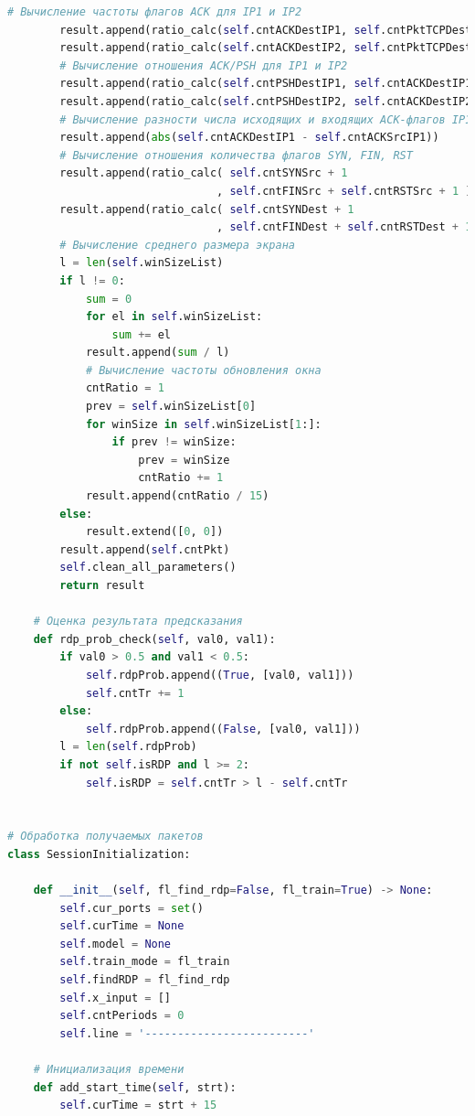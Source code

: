 \documentclass[bachelor, och, coursework]{SCWorks}
\begin{document}
\begin{lstlisting}[language=Python]
        # Вычисление частоты флагов ACK для IP1 и IP2
        result.append(ratio_calc(self.cntACKDestIP1, self.cntPktTCPDestIP1))
        result.append(ratio_calc(self.cntACKDestIP2, self.cntPktTCPDestIP2))
        # Вычисление отношения ACK/PSH для IP1 и IP2
        result.append(ratio_calc(self.cntPSHDestIP1, self.cntACKDestIP1))
        result.append(ratio_calc(self.cntPSHDestIP2, self.cntACKDestIP2))
        # Вычисление разности числа исходящих и входящих ACK-флагов IP1
        result.append(abs(self.cntACKDestIP1 - self.cntACKSrcIP1))
        # Вычисление отношения количества флагов SYN, FIN, RST
        result.append(ratio_calc( self.cntSYNSrc + 1
                                , self.cntFINSrc + self.cntRSTSrc + 1 ))
        result.append(ratio_calc( self.cntSYNDest + 1
                                , self.cntFINDest + self.cntRSTDest + 1 ))
        # Вычисление среднего размера экрана
        l = len(self.winSizeList)
        if l != 0:
            sum = 0
            for el in self.winSizeList:
                sum += el
            result.append(sum / l)
            # Вычисление частоты обновления окна
            cntRatio = 1
            prev = self.winSizeList[0]
            for winSize in self.winSizeList[1:]:
                if prev != winSize:
                    prev = winSize
                    cntRatio += 1
            result.append(cntRatio / 15)
        else:
            result.extend([0, 0])
        result.append(self.cntPkt)
        self.clean_all_parameters()
        return result

    # Оценка результата предсказания
    def rdp_prob_check(self, val0, val1):
        if val0 > 0.5 and val1 < 0.5:
            self.rdpProb.append((True, [val0, val1]))
            self.cntTr += 1
        else:
            self.rdpProb.append((False, [val0, val1]))
        l = len(self.rdpProb)
        if not self.isRDP and l >= 2:
            self.isRDP = self.cntTr > l - self.cntTr


# Обработка получаемых пакетов
class SessionInitialization:

    def __init__(self, fl_find_rdp=False, fl_train=True) -> None:
        self.cur_ports = set()
        self.curTime = None
        self.model = None
        self.train_mode = fl_train
        self.findRDP = fl_find_rdp
        self.x_input = []
        self.cntPeriods = 0
        self.line = '-------------------------'

    # Инициализация времени
    def add_start_time(self, strt):
        self.curTime = strt + 15


\end{lstlisting}
\end{document}
